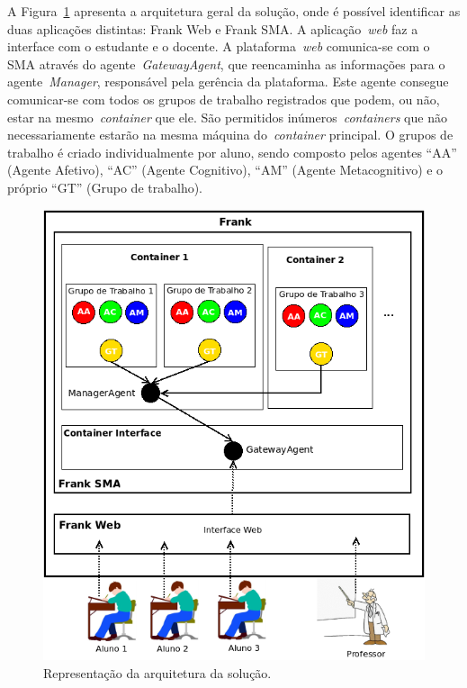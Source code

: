 A Figura~\ref{fig:arquitetura-frank} apresenta a arquitetura geral da solução, onde é possível identificar as duas aplicações distintas: Frank Web e Frank SMA. A aplicação~\emph{web} faz a interface com o estudante e o docente. A plataforma~\emph{web} comunica-se com o SMA através do agente~\emph{GatewayAgent}, que reencaminha as informações para o agente~\emph{Manager}, responsável pela gerência da plataforma. Este agente consegue comunicar-se com todos os grupos de trabalho registrados que podem, ou não, estar na mesmo~\emph{container} que ele. São permitidos inúmeros~\emph{containers} que não necessariamente estarão na mesma máquina do~\emph{container} principal. O grupos de trabalho é criado individualmente por aluno, sendo composto pelos agentes ``AA'' (Agente Afetivo), ``AC'' (Agente Cognitivo), ``AM'' (Agente Metacognitivo) e o próprio ``GT'' (Grupo de trabalho).
\begin{figure}
	\centering
	\includegraphics[scale=0.6]{images/arquitetura-frank.png}
	\caption{Representação da arquitetura da solução.}
	\label{fig:arquitetura-frank}
\end{figure}

